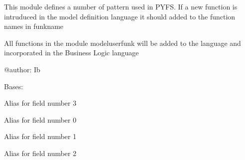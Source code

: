 \documentclass[letterpaper,10pt,english]{sphinxmanual}
\begin{document}
\sphinxAtStartPar
This module defines a number of pattern used in PYFS.
If a new function is intruduced in the model definition language it should added to the
function names in funkname

\sphinxAtStartPar
All functions in the module modeluserfunk will be added to the language and incorporated in the Business
Logic language

\sphinxAtStartPar
@author: Ib

\begin{fulllineitems}
\label{\detokenize{core/modelpattern:modelpattern.nterm}}
\pysigstartsignatures
{}
\pysigstopsignatures
\sphinxAtStartPar
Bases: 

\begin{fulllineitems}
\label{\detokenize{core/modelpattern:modelpattern.nterm.lag}}
\pysigstartsignatures
{}
\pysigstopsignatures
\sphinxAtStartPar
Alias for field number 3

\end{fulllineitems}


\begin{fulllineitems}
\label{\detokenize{core/modelpattern:modelpattern.nterm.number}}
\pysigstartsignatures
{}
\pysigstopsignatures
\sphinxAtStartPar
Alias for field number 0

\end{fulllineitems}


\begin{fulllineitems}
\label{\detokenize{core/modelpattern:modelpattern.nterm.op}}
\pysigstartsignatures
{}
\pysigstopsignatures
\sphinxAtStartPar
Alias for field number 1

\end{fulllineitems}


\begin{fulllineitems}
\label{\detokenize{core/modelpattern:modelpattern.nterm.var}}
\pysigstartsignatures
{}
\pysigstopsignatures
\sphinxAtStartPar
Alias for field number 2

\end{fulllineitems}


\end{fulllineitems}
\end{document}
